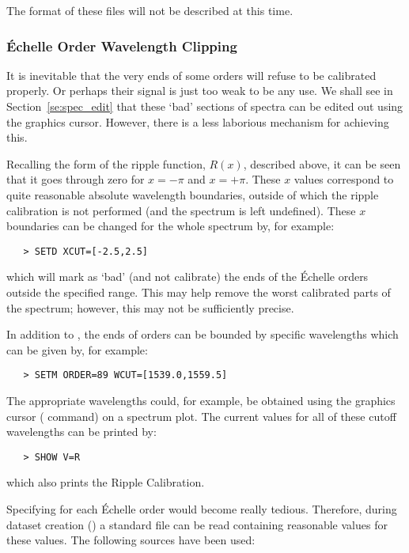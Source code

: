 The format of these files will not be described at this time.

\subsubsection{\'{E}chelle Order Wavelength Clipping}

It is inevitable that the very ends of some orders will refuse to be
calibrated properly.  Or perhaps their signal is just too weak to be any use.
We shall see in Section~\ref{se:spec_edit} that these `bad' sections of
spectra can be edited out using the graphics cursor.  However, there is a
less laborious mechanism for achieving this.

Recalling the form of the ripple function, $R(x)$, described above, it can be
seen that it goes through zero for $x=-\pi$ and $x=+\pi$\@.  These $x$
values correspond to quite reasonable absolute wavelength boundaries, outside
of which the ripple calibration is not performed (and the spectrum is left
undefined)\@. These $x$ boundaries can be changed for the whole spectrum by,
for example:

\begin{verbatim}
   > SETD XCUT=[-2.5,2.5]
\end{verbatim}

which will mark as `bad' (and not calibrate) the ends of the \'{E}chelle orders
outside the specified range.  This may help remove the worst calibrated
parts of the spectrum; however, this may not be sufficiently
precise.

In addition to , the ends of orders can be
bounded by specific wavelengths which can be given by, for example:

\begin{verbatim}
   > SETM ORDER=89 WCUT=[1539.0,1559.5]
\end{verbatim}

The appropriate wavelengths could, for example, be obtained using the graphics
cursor ( command) on a spectrum plot.
The current values for all of these cutoff wavelengths can be printed by:

\begin{verbatim}
   > SHOW V=R
\end{verbatim}

which also prints the Ripple Calibration.

Specifying 
 for each \'{E}chelle order would become really tedious.
Therefore, during dataset creation ()
a standard file can be read containing reasonable values for these
 values.  The following
sources have been used:

